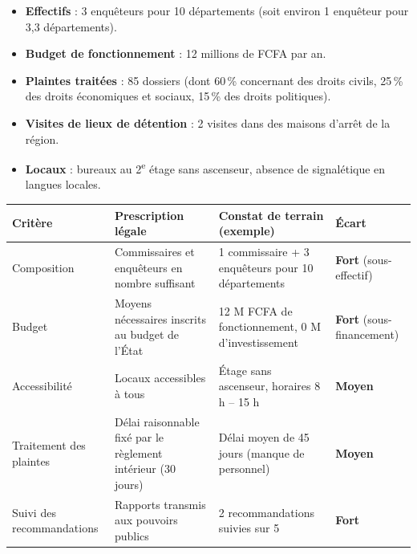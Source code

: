 \documentclass[11pt]{article}
\begin{document}
\begin{exemplebox}
\begin{itemize}
    \item \textbf{Effectifs} : 3 enquêteurs pour 10 départements (soit environ 1 enquêteur pour 3,3 départements).
    \item \textbf{Budget de fonctionnement} : 12 millions de FCFA par an.
    \item \textbf{Plaintes traitées} : 85 dossiers (dont 60\,\% concernant des droits civils, 25\,\% des droits économiques et sociaux, 15\,\% des droits politiques).
    \item \textbf{Visites de lieux de détention} : 2 visites dans des maisons d'arrêt de la région.
    \item \textbf{Locaux} : bureaux au 2\textsuperscript{e} étage sans ascenseur, absence de signalétique en langues locales.
\end{itemize}
\end{exemplebox}

\begin{aretenir}
\begin{center}
\begin{tabularx}{\linewidth}{|l|X|X|X|}\hline
\textbf{Critère} & \textbf{Prescription légale} & \textbf{Constat de terrain (exemple)} & \textbf{Écart} \\ \hline
Composition & Commissaires et enquêteurs en nombre suffisant & 1 commissaire + 3 enquêteurs pour 10 départements & \textbf{Fort} (sous-effectif) \\ \hline
Budget & Moyens nécessaires inscrits au budget de l'État & 12 M FCFA de fonctionnement, 0 M d'investissement & \textbf{Fort} (sous-financement) \\ \hline
Accessibilité & Locaux accessibles à tous & Étage sans ascenseur, horaires 8 h -- 15 h & \textbf{Moyen} \\ \hline
Traitement des plaintes & Délai raisonnable fixé par le règlement intérieur (30 jours) & Délai moyen de 45 jours (manque de personnel) & \textbf{Moyen} \\ \hline
Suivi des recommandations & Rapports transmis aux pouvoirs publics & 2 recommandations suivies sur 5 & \textbf{Fort} \\ \hline
\end{tabularx}
\end{center}
\end{aretenir}
\end{document}

